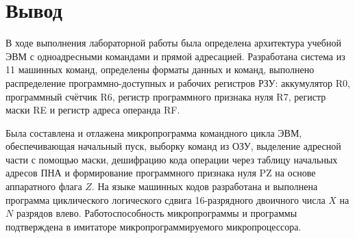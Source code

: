 \documentclass[11pt, a4paper]{article}
\begin{document}
\section{Вывод}
В ходе выполнения лабораторной работы была определена архитектура учебной ЭВМ с одноадресными командами и прямой адресацией. Разработана система из 11 машинных команд, определены форматы данных и команд, выполнено распределение программно-доступных и рабочих регистров РЗУ: аккумулятор R0, программный счётчик R6, регистр программного признака нуля R7, регистр маски RE и регистр адреса операнда RF.

Была составлена и отлажена микропрограмма командного цикла ЭВМ, обеспечивающая начальный пуск, выборку команд из ОЗУ, выделение адресной части с помощью маски, дешифрацию кода операции через таблицу начальных адресов ПНА и формирование программного признака нуля PZ на основе аппаратного флага $Z$. На языке машинных кодов разработана и выполнена программа циклического логического сдвига 16-разрядного двоичного числа $X$ на $N$ разрядов влево. Работоспособность микропрограммы и программы подтверждена в имитаторе микропрограммируемого микропроцессора.
\end{document}
